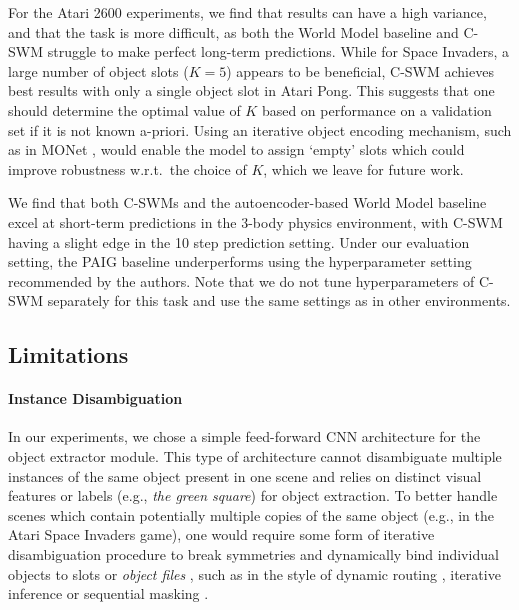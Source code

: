 \documentclass{article} %
\begin{document}
For the Atari 2600 experiments, we find that results can have a high variance, and that the task is more difficult, as both the World Model baseline and C-SWM struggle to make perfect long-term predictions. While for Space Invaders, a large number of object slots ($K=5$) appears to be beneficial, C-SWM achieves best results with only a single object slot in Atari Pong. This suggests that one should determine the optimal value of $K$ based on performance on a validation set if it is not known a-priori. Using an iterative object encoding mechanism, such as in MONet \citep{burgess2019monet}, would enable the model to assign `empty' slots which could improve robustness w.r.t.~the choice of $K$, which we leave for future work.

We find that both C-SWMs and the autoencoder-based World Model baseline excel at short-term predictions in the 3-body physics environment, with C-SWM having a slight edge in the 10 step prediction setting. Under our evaluation setting, the PAIG baseline \citep{jaques2019physics} underperforms using the hyperparameter setting recommended by the authors. Note that we do not tune hyperparameters of C-SWM separately for this task and use the same settings as in other environments.

\subsection{Limitations}
\paragraph{Instance Disambiguation}
In our experiments, we chose a simple feed-forward CNN architecture for the object extractor module. This type of architecture cannot disambiguate multiple instances of the same object present in one scene and relies on distinct visual features or labels (e.g., \textit{the green square}) for object extraction. To better handle scenes which contain potentially multiple copies of the same object (e.g., in the Atari Space Invaders game), one would require some form of iterative disambiguation procedure to break symmetries and dynamically bind individual objects to slots or \textit{object files} \citep{KahnemanTreisman84,kahneman1992reviewing}, such as in the style of dynamic routing \citep{sabour2017dynamic}, iterative inference \citep{greff2019multi,engelcke2019genesis} or sequential masking \citep{burgess2019monet,kipf2019compile}.
\end{document}
